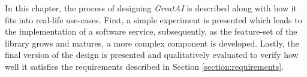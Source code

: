 In this chapter, the process of designing \textit{GreatAI} is described along with how it fits into real-life use-cases. First, a simple experiment is presented which leads to the implementation of a software service, subsequently, as the feature-set of the library grows and matures, a more complex component is developed. Lastly, the final version of the design is presented and qualitatively evaluated to verify how well it satisfies the requirements described in Section \ref{section:requirements}.



